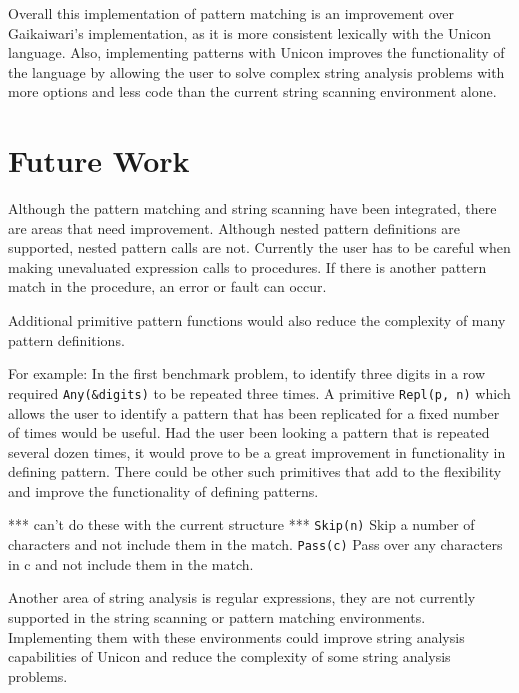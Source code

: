 \documentclass{article}
\begin{document}
Overall this implementation of pattern matching is an improvement over Gaikaiwari's implementation, as it is more consistent lexically with the Unicon language.  Also, implementing patterns with Unicon improves the functionality of the language by allowing the user to solve complex string analysis problems with more options and less code than the current string scanning environment alone.

\section{Future Work}
Although the pattern matching and string scanning have been integrated, there are areas that need improvement.  Although nested pattern definitions are supported, nested pattern calls are not.  Currently the user has to be careful when making unevaluated expression calls to procedures.  If there is another pattern match in the procedure, an error or fault can occur.

Additional primitive pattern functions would also reduce the complexity of many pattern definitions.  

For example: In the first benchmark problem, to identify three digits in a row required \texttt{Any(\&digits)} to be repeated three times.  A primitive \texttt{Repl(p, n)} which allows the user to identify a pattern that has been replicated for a fixed number of times would be useful.  Had the user been looking a pattern that is repeated several dozen times, it would prove to be a great improvement in functionality in defining pattern.  There could be other such primitives that add to the flexibility and improve the functionality of defining patterns.

*** can't do these with the current structure ***
\texttt{Skip(n)}  Skip a number of characters and not include them in the match.
\texttt{Pass(c)}  Pass over any characters in c and not include them in the match.

Another area of string analysis is regular expressions, they are not currently supported in the string scanning or pattern matching environments.  Implementing them with these environments could improve string analysis capabilities of Unicon and reduce the complexity of some string analysis problems. 

\newpage
  \renewcommand{\theequation}{A-\arabic{equation}}
  \setcounter{equation}{0}  %
\end{document}
